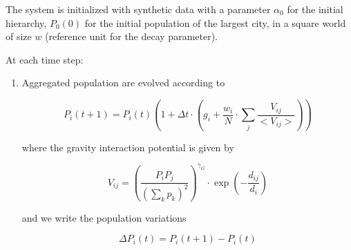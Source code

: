 \documentclass[11pt]{article}
\begin{document}
The system is initialized with synthetic data with a parameter $\alpha_0$ for the initial hierarchy, $P_0 (0)$ for the initial population of the largest city, in a square world of size $w$ (reference unit for the decay parameter).

At each time step:

\begin{enumerate}
	\item Aggregated population are evolved according to
	
	\begin{equation}
		P_i(t+1) = P_i(t) \left(1 + \Delta t \cdot \left(g_i + \frac{w_i}{N} \cdot \sum_j \frac{V_{ij}}{<V_{ij}>} \right) \right)
	\end{equation}
	
	where the gravity interaction potential is given by 
	
	\begin{equation}
		V_{ij} = \left(\frac{P_i P_j}{(\sum_k p_k)^2}\right)^{\gamma_G} \cdot \exp \left(- \frac{d_{ij}}{d_i} \right)
	\end{equation}

	and we write the population variations
	
	\begin{equation}
		\Delta P_i (t) = P_i (t + 1) - P_i (t)
	\end{equation}


\end{enumerate}
\end{document}
